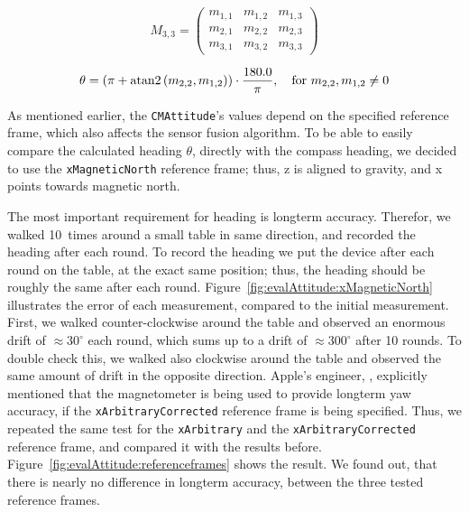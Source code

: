 \begin{equation} \label{eq:rotationmatrix}
  M_{3,3} = \begin{pmatrix}
      m_{1,1} & m_{1,2} & m_{1,3} \\
      m_{2,1} & m_{2,2} & m_{2,3} \\
      m_{3,1} & m_{3,2} & m_{3,3}
  \end{pmatrix}
\end{equation}

\begin{equation} \label{eq:rotation2heading}
  \theta = (\pi + {\rm atan2}\left(m_{2,2} , m_{1,2}\right)) \cdot \frac{180.0}{\pi}, \quad \text{for } m_{2,2}, m_{1,2} \neq 0
\end{equation}

As mentioned earlier, the \texttt{CMAttitude}'s values depend on the specified reference frame, which also affects the sensor fusion algorithm. To be able to easily compare the calculated heading $\theta$, directly with the compass heading, we decided to use the \texttt{xMagneticNorth} reference frame; thus, z is aligned to gravity, and x points towards magnetic north.

The most important requirement for heading is longterm accuracy. Therefor, we walked 10~times around a small table in same direction, and recorded the heading after each round. To record the heading we put the device after each round on the table, at the exact same position; thus, the heading should be roughly the same after each round. Figure~\ref{fig:evalAttitude:xMagneticNorth} illustrates the error of each measurement, compared to the initial measurement. First, we walked counter-clockwise around the table and observed an enormous drift of $\approx 30^{\circ}$ each round, which sums up to a drift of $\approx 300^{\circ}$ after 10 rounds. To double check this, we walked also clockwise around the table and observed the same amount of drift in the opposite direction. Apple's engineer, \citet{apple:wwdc_2014_pham}, explicitly mentioned that the magnetometer is being used to provide longterm yaw accuracy, if the \texttt{xArbitraryCorrected} reference frame is being specified. Thus, we repeated the same test for the \texttt{xArbitrary} and the \texttt{xArbitraryCorrected} reference frame, and compared it with the results before. Figure~\ref{fig:evalAttitude:referenceframes} shows the result. We found out, that there is nearly no difference in longterm accuracy, between the three tested reference frames.


